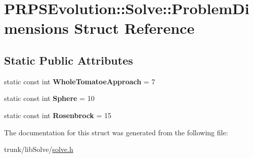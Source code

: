 \hypertarget{struct_p_r_p_s_evolution_1_1_solve_1_1_problem_dimensions}{\section{P\-R\-P\-S\-Evolution\-:\-:Solve\-:\-:Problem\-Dimensions Struct Reference}
\label{struct_p_r_p_s_evolution_1_1_solve_1_1_problem_dimensions}
}
\subsection*{Static Public Attributes}
\begin{DoxyCompactItemize}
\item 
\hypertarget{struct_p_r_p_s_evolution_1_1_solve_1_1_problem_dimensions_a5abb5066eb58f43d9191321663060577}{static const int {\bfseries Whole\-Tomatoe\-Approach} = 7}\label{struct_p_r_p_s_evolution_1_1_solve_1_1_problem_dimensions_a5abb5066eb58f43d9191321663060577}

\item 
\hypertarget{struct_p_r_p_s_evolution_1_1_solve_1_1_problem_dimensions_ad9618a30818a9c1933fb44f0faa8fa06}{static const int {\bfseries Sphere} = 10}\label{struct_p_r_p_s_evolution_1_1_solve_1_1_problem_dimensions_ad9618a30818a9c1933fb44f0faa8fa06}

\item 
\hypertarget{struct_p_r_p_s_evolution_1_1_solve_1_1_problem_dimensions_ad0ee4c5c3488a890cbf8e4989ec2b922}{static const int {\bfseries Rosenbrock} = 15}\label{struct_p_r_p_s_evolution_1_1_solve_1_1_problem_dimensions_ad0ee4c5c3488a890cbf8e4989ec2b922}

\end{DoxyCompactItemize}


The documentation for this struct was generated from the following file\-:\begin{DoxyCompactItemize}
\item 
trunk/lib\-Solve/\hyperlink{solve_8h}{solve.\-h}\end{DoxyCompactItemize}
